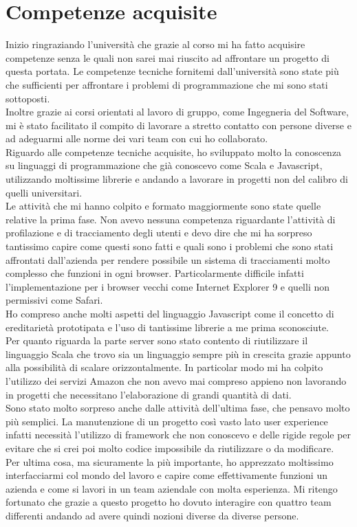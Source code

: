 \documentclass[a4paper, 12pt, twoside, openright]{book}
\begin{document}
\section{Competenze acquisite}
Inizio ringraziando l'università che grazie al corso mi ha fatto acquisire competenze senza le quali non sarei mai riuscito ad affrontare un progetto di questa portata. Le competenze tecniche fornitemi dall'università sono state più che sufficienti per affrontare i problemi di programmazione che mi sono stati sottoposti.\\
Inoltre grazie ai corsi orientati al lavoro di gruppo, come Ingegneria del Software, mi è stato facilitato il compito di lavorare a stretto contatto con persone diverse e ad adeguarmi alle norme dei vari team con cui ho collaborato.\\
Riguardo alle competenze tecniche acquisite, ho sviluppato molto la conoscenza su linguaggi di programmazione che già conoscevo come Scala e Javascript, utilizzando moltissime librerie e andando a lavorare in progetti non del calibro di quelli universitari.\\
Le attività che mi hanno colpito e formato maggiormente sono state quelle relative la prima fase. Non avevo nessuna competenza riguardante l'attività di profilazione e di tracciamento degli utenti e devo dire che mi ha sorpreso tantissimo capire come questi sono fatti e quali sono i problemi che sono stati affrontati dall'azienda per rendere possibile un sistema di tracciamenti molto complesso che funzioni in ogni browser. Particolarmente difficile infatti l'implementazione per i browser vecchi come Internet Explorer 9 e quelli non permissivi come Safari.\\
Ho compreso anche molti aspetti del linguaggio Javascript come il concetto di ereditarietà prototipata e l'uso di tantissime librerie a me prima sconosciute.\\
Per quanto riguarda la parte server sono stato contento di riutilizzare il linguaggio Scala che trovo sia un linguaggio sempre più in crescita grazie appunto alla possibilità di scalare orizzontalmente. In particolar modo mi ha colpito l'utilizzo dei servizi Amazon che non avevo mai compreso appieno non lavorando in progetti che necessitano l'elaborazione di grandi quantità di dati.\\
Sono stato molto sorpreso anche dalle attività dell'ultima fase, che pensavo molto più semplici. La manutenzione di un progetto così vasto lato user experience infatti necessità l'utilizzo di framework che non conoscevo e delle rigide regole per evitare che si crei poi molto codice impossibile da riutilizzare o da modificare.\\
Per ultima cosa, ma sicuramente la più importante, ho apprezzato moltissimo interfacciarmi col mondo del lavoro e capire come effettivamente funzioni un azienda e come si lavori in un team aziendale con molta esperienza. Mi ritengo fortunato che grazie a questo progetto ho dovuto interagire con quattro team differenti andando ad avere quindi nozioni diverse da diverse persone.\\
\end{document}
